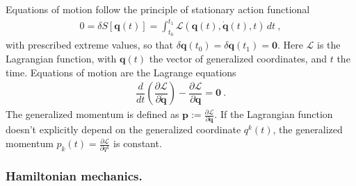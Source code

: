 \documentclass[letterpaper,10pt,english]{jupyterBook}
\begin{document}
\sphinxAtStartPar
Equations of motion follow the principle of stationary action functional
\begin{equation}\label{equation:ch/quantum-mechanics/analytical-mechanics:eq:analytical:stationary-action}
\begin{split}0 = \delta S[\mathbf{q}(t)] = \int_{t_0}^{t_1} \mathcal{L}( \mathbf{q}(t), \dot{\mathbf{q}}(t),t ) \, dt \ ,\end{split}
\end{equation}
\sphinxAtStartPar
with prescribed extreme values, so that \(\delta \mathbf{q}(t_0) = \delta \mathbf{q}(t_1) = \mathbf{0}\). Here \(\mathcal{L}\) is the Lagrangian function, with \(\mathbf{q}(t)\) the vector of generalized coordinates, and \(t\) the time. Equations of motion are the Lagrange equations
\begin{equation}\label{equation:ch/quantum-mechanics/analytical-mechanics:eq:analytical:lagrange-eqns}
\begin{split}\dfrac{d}{dt}\left( \dfrac{\partial \mathcal{L}}{\partial \dot{\mathbf{q}}} \right) - \dfrac{\partial \mathcal{L}}{\partial \mathbf{q}} = \mathbf{0} \ .\end{split}
\end{equation}
\sphinxAtStartPar
The generalized momentum is defined as \(\mathbf{p} := \frac{\partial \mathcal{L}}{\partial \dot{\mathbf{q}}}\). If the Lagrangian function doesn’t explicitly depend on the generalized coordinate \(q^k(t)\), the generalized momentum \(p_k(t) = \frac{\partial \mathcal{L}}{\partial q^k}\) is constant.
\subsubsection*{Hamiltonian mechanics. }
\end{document}
